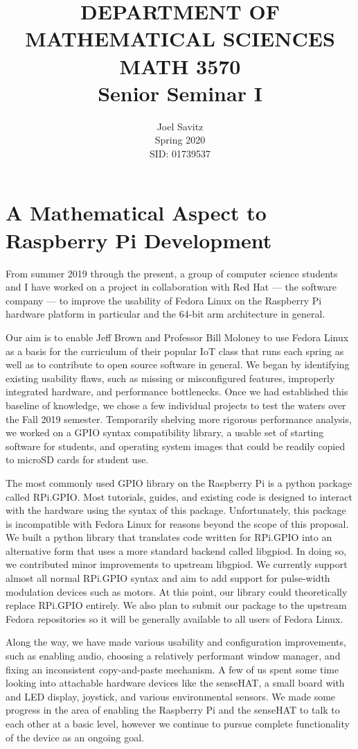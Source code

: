 \documentclass[12pt]{amsart}
\title{DEPARTMENT OF MATHEMATICAL SCIENCES \protect\\
MATH 3570 \protect\\
Senior Seminar I}
\author{Joel Savitz \\ Spring 2020 \\ SID: 01739537}
\begin{document}
\maketitle

\section*{A Mathematical Aspect to Raspberry Pi Development}

From summer 2019 through the present, a group of computer science students and I have worked on a project in collaboration with Red Hat --- the software company --- to improve the usability of Fedora Linux on the Raspberry Pi hardware platform in particular and the 64-bit arm architecture in general.

Our aim is to enable Jeff Brown and Professor Bill Moloney to use Fedora Linux as a basis for the curriculum of their popular IoT class that runs each spring as well as to contribute to open source software in general.
We began by identifying existing usability flaws, such as missing or misconfigured features, improperly integrated hardware, and performance bottlenecks. Once we had established this baseline of knowledge, we chose a few individual projects to test the waters over the Fall 2019 semester. Temporarily shelving more rigorous performance analysis, we worked on a GPIO syntax compatibility library, a usable set of starting software for students, and operating system images that could be readily copied to microSD cards for student use.

The most commonly used GPIO library on the Raspberry Pi is a python package called RPi.GPIO. Most tutorials, guides, and existing code is designed to interact with the hardware using the syntax of this package. Unfortunately, this package is incompatible with Fedora Linux for reasons beyond the scope of this proposal. We built a python library that translates code written for RPi.GPIO into an alternative form that uses a more standard backend called libgpiod. In doing so, we contributed minor improvements to upstream libgpiod. We currently support almost all normal RPi.GPIO syntax and aim to add support for pulse-width modulation devices such as motors. At this point, our library could theoretically replace RPi.GPIO entirely. We also plan to submit our package to the upstream Fedora repositories so it will be generally available to all users of Fedora Linux.

Along the way, we have made various usability and configuration improvements, such as enabling audio, choosing a relatively performant window manager, and fixing an inconsistent copy-and-paste mechanism. A few of us spent some time looking into attachable hardware devices like the senseHAT, a small board with and LED display, joystick, and various environmental sensors. We made some progress in the area of enabling the Raspberry Pi and the senseHAT to talk to each other at a basic level, however we continue to pursue complete functionality of the device as an ongoing goal.
\end{document}
